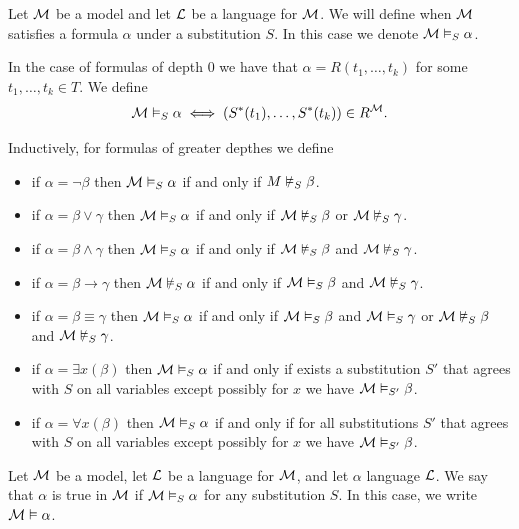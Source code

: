 \documentclass[11pt,a4paper]{article}
\DeclareRobustCommand{\models}{%
  \mathrel{\vDash}%
}
\DeclareRobustCommand{\nmodels}{%
  \mathrel{\text{\ooalign{$\vDash$\cr\hss\raisebox{0.2ex}{\scalebox{0.8}{$/$}}\hss}}}%
}
\renewcommand{\implies}{\rightarrow}
\begin{document}
\begin{definition}
  Let $\mathcal{M}$ be a model and let $\mathcal{L}$ be a language for $\mathcal{M}$.
  We will define when $\mathcal{M}$ satisfies a formula $\alpha$ under a
  substitution $S$. In this case we denote $\M \models_S \alpha$.

  In the case of formulas of depth $0$ we have that 
  $\alpha = R(t_1,\dots,t_k)$ for some $t_1,\dots,t_k \in T$.
  We define
  \[
    \M \models_S \alpha \iff (S^*(t_1),\dots,S^*(t_k)) \in R^\M.
  \]

  Inductively, for formulas of greater depthes we define
  \begin{itemize}
    \item if $\alpha = \neg \beta$ then $\M \models_S \alpha$ if and only
      if $M \nmodels_S \beta$.
    \item if $\alpha = \beta \lor \gamma$ then $\M \models_S \alpha$ if and 
      only if $\M \nmodels_S \beta$ or $\M \nmodels_S \gamma$.
    \item if $\alpha = \beta \land \gamma$ then $\M \models_S \alpha$ if and 
      only if $\M \nmodels_S \beta$ and $\M \nmodels_S \gamma$.
    \item if $\alpha = \beta \implies \gamma$ then $\M \nmodels_S \alpha$ 
      if and only if $\M \models_S \beta$ and $\M \nmodels_S \gamma$.
    \item if $\alpha = \beta \equiv \gamma$ then $\M \models_S \alpha$ 
      if and only if $\M \models_S \beta$ and $\M \models_S \gamma$ or
      $\M \nmodels_S \beta$ and $\M \nmodels_S \gamma$.
    \item if $\alpha = \exists x(\beta)$ then $\M \models_S \alpha$ if
      and only if exists a substitution $S'$ that agrees with $S$ on all
      variables except possibly for $x$ we have $\M \models_{S'} \beta$.
    \item if $\alpha = \forall x(\beta)$ then $\M \models_S \alpha$ if
      and only if for all substitutions $S'$ that agrees with $S$ on all
      variables except possibly for $x$ we have $\M \models_{S'} \beta$.
  \end{itemize}
\end{definition}

\begin{definition}
  Let $\mathcal{M}$ be a model, let $\mathcal{L}$ be a language for $\mathcal{M}$, 
  and let $\alpha$ language $\mathcal{L}$.
  We say that $\alpha$ is true in $\mathcal{M}$ if $\M \models_S \alpha$ for any
  substitution $S$.
  In this case, we write $\M \models \alpha$.
\end{definition}
\end{document}
